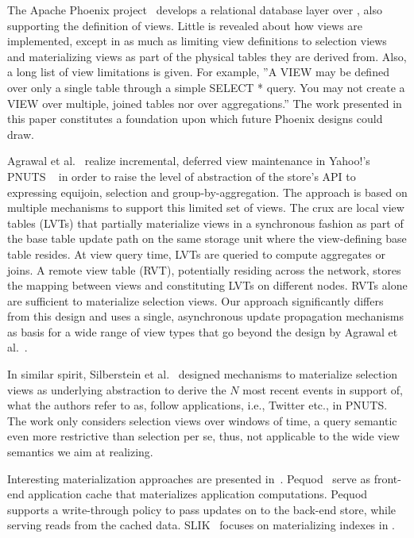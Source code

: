 The Apache Phoenix project~\cite{phoenix:apache} develops a relational
database layer over \HB, also supporting the definition of
views. Little is revealed about how views are implemented, except in
as much as limiting view definitions to selection views and
materializing views as part of the physical tables they are derived
from. Also, a long list of view limitations is given. For
  example, ''A VIEW may be defined over only a single table through a
  simple SELECT * query. You may not create a VIEW over multiple,
  joined tables nor over aggregations.''\cite{phoenix:apache} The work
presented in this paper constitutes a foundation upon which future
Phoenix designs could draw.

Agrawal et al.~\cite{agrawal:asynchronous} realize incremental,
deferred view maintenance in Yahoo!'s PNUTS \KVS~\cite{cooper:pnuts}
in order to raise the level of abstraction of the store's API to
expressing equijoin, selection and group-by-aggregation. The approach
is based on multiple mechanisms to support this limited set of
views. The crux are local view tables (LVTs) that partially
materialize views in a synchronous fashion as part of the base table
update path on the same storage unit where the view-defining base
table resides. At view query time, LVTs are queried to compute
aggregates or joins. A remote view table (RVT), potentially residing
across the network, stores the mapping between views and constituting
LVTs on different nodes. RVTs alone are sufficient to materialize
selection views. Our approach significantly differs from this design
and uses a single, asynchronous update propagation mechanisms as basis
for a wide range of view types that go beyond the design by Agrawal et
al.~\cite{agrawal:asynchronous}.

In similar spirit, Silberstein et al.~\cite{silberstein:feeding}
designed mechanisms to materialize selection views as underlying
abstraction to derive the $N$ most recent events in support of, what
the authors refer to as, follow applications, i.e., Twitter etc., in
PNUTS. The work only considers selection views over windows of time, a
query semantic even more restrictive than selection per se, thus, not
applicable to the wide view semantics we aim at realizing.

%
%      
Interesting materialization approaches are presented
in~\cite{kate:easy, kejriwal:slik}. Pequod~\cite{kate:easy} serve as
front-end application cache that materializes application
computations.  Pequod supports a write-through policy to pass updates
on to the back-end store, while serving reads from the cached data.
SLIK~\cite{kejriwal:slik} focuses on materializing indexes in \KVSs.


